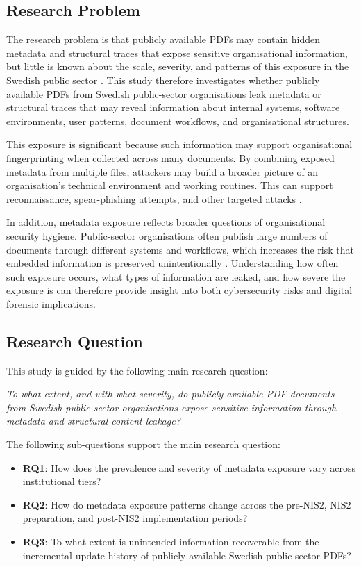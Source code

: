 \documentclass[conference]{IEEEtran}
\begin{document}
\subsection{Research Problem}
The research problem is that publicly available PDFs may contain hidden metadata and structural traces that expose sensitive organisational information, but little is known about the scale, severity, and patterns of this exposure in the Swedish public sector \cite{nsa2008, castiglione2010}. This study therefore investigates whether publicly available PDFs from Swedish public-sector organisations leak metadata or structural traces that may reveal information about internal systems, software environments, user patterns, document workflows, and organisational structures.

This exposure is significant because such information may support organisational fingerprinting when collected across many documents. By combining exposed metadata from multiple files, attackers may build a broader picture of an organisation’s technical environment and working routines. This can support reconnaissance, spear-phishing attempts, and other targeted attacks \cite{hasegawa2022, adhatarao2021}.

In addition, metadata exposure reflects broader questions of organisational security hygiene. Public-sector organisations often publish large numbers of documents through different systems and workflows, which increases the risk that embedded information is preserved unintentionally \cite{nsa2008, castiglione2010}. Understanding how often such exposure occurs, what types of information are leaked, and how severe the exposure is can therefore provide insight into both cybersecurity risks and digital forensic implications.

\subsection{Research Question}
This study is guided by the following main research question:

\textit{To what extent, and with what severity, do publicly available PDF documents from Swedish public-sector organisations expose sensitive information through metadata and structural content leakage?}

The following sub-questions support the main research question:
\begin{itemize}
    \item \textbf{RQ1}: How does the prevalence and severity of metadata exposure vary across institutional tiers?
    \item \textbf{RQ2}: How do metadata exposure patterns change across the pre-NIS2, NIS2 preparation, and post-NIS2 implementation periods?
    \item \textbf{RQ3}: To what extent is unintended information recoverable from the incremental update history of publicly available Swedish public-sector PDFs?
\end{itemize}
\end{document}
